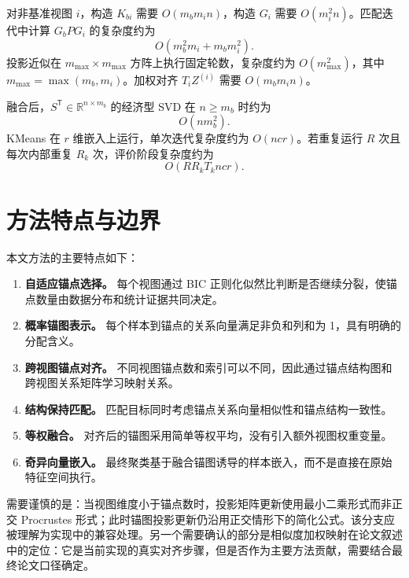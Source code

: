 \documentclass[UTF8,a4paper,12pt,fontset=none]{ctexart}
\newcommand{\R}{\mathbb{R}}
\newcommand{\T}{\mathsf{T}}
\begin{document}
对非基准视图 \(i\)，构造 \(K_{bi}\) 需要 \(O(m_bm_in)\)，构造 \(G_i\) 需要 \(O(m_i^2n)\)。匹配迭代中计算 \(G_bPG_i\) 的复杂度约为
\begin{equation}
O(m_b^2m_i+m_bm_i^2).
\end{equation}
投影近似在 \(m_{\max}\times m_{\max}\) 方阵上执行固定轮数，复杂度约为 \(O(m_{\max}^2)\)，其中 \(m_{\max}=\max(m_b,m_i)\)。加权对齐 \(T_iZ^{(i)}\) 需要 \(O(m_bm_in)\)。

融合后，\(S^\T\in\R^{n\times m_b}\) 的经济型 SVD 在 \(n\ge m_b\) 时约为
\begin{equation}
O(nm_b^2).
\end{equation}
KMeans 在 \(r\) 维嵌入上运行，单次迭代复杂度约为 \(O(ncr)\)。若重复运行 \(R\) 次且每次内部重复 \(R_k\) 次，评价阶段复杂度约为
\begin{equation}
O(RR_kT_kncr).
\end{equation}

\section{方法特点与边界}

本文方法的主要特点如下：
\begin{enumerate}
  \item \textbf{自适应锚点选择。} 每个视图通过 BIC 正则化似然比判断是否继续分裂，使锚点数量由数据分布和统计证据共同决定。
  \item \textbf{概率锚图表示。} 每个样本到锚点的关系向量满足非负和列和为 1，具有明确的分配含义。
  \item \textbf{跨视图锚点对齐。} 不同视图锚点数和索引可以不同，因此通过锚点结构图和跨视图关系矩阵学习映射关系。
  \item \textbf{结构保持匹配。} 匹配目标同时考虑锚点关系向量相似性和锚点结构一致性。
  \item \textbf{等权融合。} 对齐后的锚图采用简单等权平均，没有引入额外视图权重变量。
  \item \textbf{奇异向量嵌入。} 最终聚类基于融合锚图诱导的样本嵌入，而不是直接在原始特征空间执行。
\end{enumerate}

需要谨慎的是：当视图维度小于锚点数时，投影矩阵更新使用最小二乘形式而非正交 Procrustes 形式；此时锚图投影更新仍沿用正交情形下的简化公式。该分支应被理解为实现中的兼容处理。另一个需要确认的部分是相似度加权映射在论文叙述中的定位：它是当前实现的真实对齐步骤，但是否作为主要方法贡献，需要结合最终论文口径确定。
\end{document}
